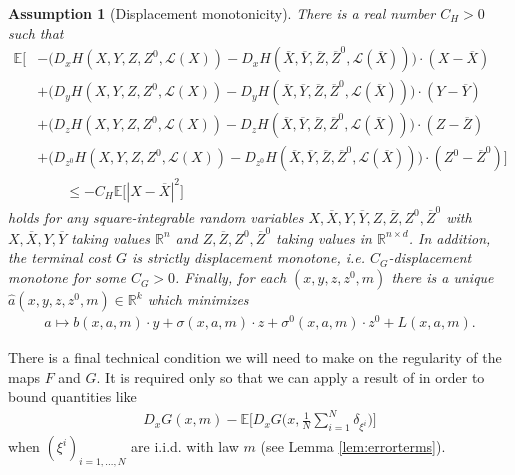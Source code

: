 \documentclass[11pt,reqno]{amsart}
\numberwithin{equation}{section}
\newtheorem{assumption}[theorem]{Assumption}
\theoremstyle{definition}
\def\E{{\mathbb E}}
\def\R{{\mathbb R}}
\newcommand{\sL}{\mathcal{L}}
\newcommand{\ov}{\overline}
\def \E{\mathbb{E}}
\def \R{\mathbb{R}}
\begin{document}
\begin{assumption}[Displacement monotonicity] \label{assump:controlledvolstruct}
There is a real number $C_H > 0$ such that
\begin{align} \label{hamiltonianmonotone}
  \E\bigg[ &- \big(D_x H (X,Y,Z,Z^0,\sL(X)) - D_x H(\ov{X},\ov{Y},\ov{Z},\ov{Z}^0, \sL(\ov{X})) \big) \cdot (X - \ov{X})  \nonumber 
  \\  &+ \big(D_y H(X,Y,Z,Z^0,\sL(X)) - D_y H(\ov{X},\ov{Y},\ov{Z},\ov{Z}^0, \sL(\ov{X})) \big) \cdot (Y - \ov{Y}) \nonumber \\ &+ \big(D_z H (X,Y,Z,Z^0,\sL(X)) - D_z H(\ov{X},\ov{Y},\ov{Z},\ov{Z}^0, \sL(\ov{X})) \big) \cdot (Z - \ov{Z}) \nonumber 
  \\ & + \big(D_{z^0} H(X,Y,Z,Z^0,\sL(X)) - D_{z^0} H(\ov{X},\ov{Y},\ov{Z},\ov{Z}^0, \sL(\ov{X})) \big) \cdot (Z^0 - \ov{Z}^0) \bigg] \nonumber \\
& \quad \quad \leq - C_H \E\big[|X - \ov{X}|^2\big]
\end{align}
holds for any square-integrable random variables $X,\ov{X}, Y,\ov{Y}, Z, \ov{Z}, Z^0, \ov{Z}^0$ with $X, \ov{X}, Y, \ov{Y}$ taking values $\R^n$ and $Z, \ov{Z}, Z^0, \ov{Z}^0$ taking values in $\R^{n \times d}$. In addition, the terminal cost $G$ is strictly displacement monotone, i.e. $C_G$-displacement monotone for some $C_G > 0$. Finally, for each $(x,y,z,z^0, m)$ there is a unique $\hat{a}(x,y,z,z^0,m) \in \R^k$ which minimizes 
\begin{align} \label{hconvex}
  a \mapsto b(x,a,m) \cdot y + \sigma(x,a,m)\cdot z  + \sigma^0(x,a,m)\cdot z^0 + L(x,a,m). 
\end{align}
\end{assumption}



There is a final technical condition we will need to make on the regularity of the maps $F$ and $G$. It is required only so that we can apply a result of \cite{CST} in order to bound quantities like 
\begin{align*}
D_x G(x,m) - \E\Big[D_x G\big(x,\frac{1}{N} \sum_{i = 1}^N \delta_{\xi^i}\big) \Big]
\end{align*}
when $(\xi^i)_{i = 1,\dots,N}$ are i.i.d. with law $m$ (see Lemma \ref{lem:errorterms}).
\end{document}
